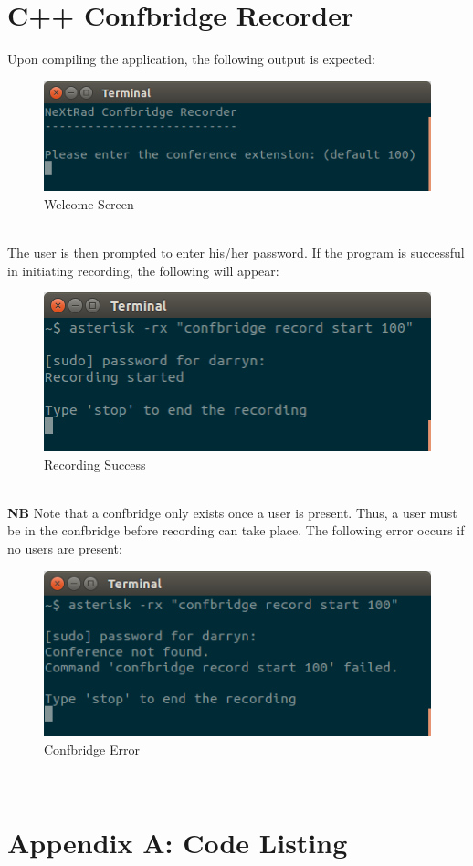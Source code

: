 \documentclass[a4paper,11pt]{report}
\begin{document}
\newpage
\section{C++ Confbridge Recorder}
Upon compiling the application, the following output is expected:
\begin{figure}[h]
  \begin{center}
    \includegraphics[scale = 0.5]{welcome}
    \caption{Welcome Screen}
  \end{center}
\end{figure}\\
The user is then prompted to enter his/her password. If the program is successful in initiating recording, the following will appear:
\begin{figure}[h]
  \begin{center}
    \includegraphics[scale = 0.5]{start}
    \caption{Recording Success}
  \end{center}
\end{figure}\\
\textbf{NB} Note that a confbridge only exists once a user is present. Thus, a user must be in the confbridge before recording can take place. The following error occurs if no users are present:
\begin{figure}[h]
  \begin{center}
    \includegraphics[scale = 0.5]{confbridge_error}
    \caption{Confbridge Error}
  \end{center}
\end{figure}\\


\newpage
\section*{Appendix A: Code Listing}

\lstset{escapechar=@,style=customc}

\end{document}
